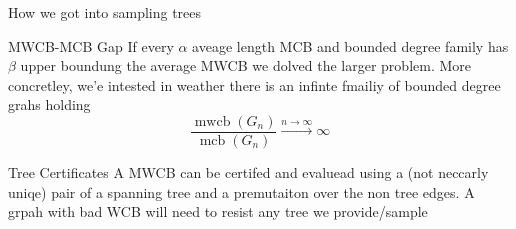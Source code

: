 \begin{frame}{How we got into sampling trees}
    \begin{block}{MWCB-MCB Gap}
        If every $\alpha$ aveage length MCB and bounded degree family has $\beta$ upper boundung the average MWCB we dolved the larger problem. More concretley, we'e intested in weather there is an infinte fmailiy of bounded degree grahs holding 
        \[
        \frac{\operatorname{mwcb}(G_n)}{\operatorname{mcb}(G_n)}\xrightarrow[]{n\to \infty}\infty
        \]
    \end{block}
    \begin{block}{Tree Certificates}
    A MWCB can be certifed and evaluead using a (not neccarly uniqe) pair of a spanning tree and a premutaiton over the non tree edges. A grpah with bad WCB will need to resist any tree we provide/sample
\end{block}
\end{frame}